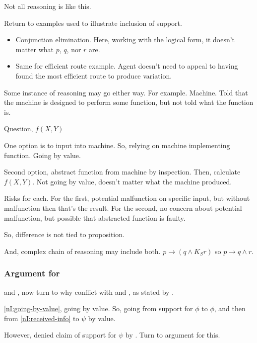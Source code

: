 \begin{note}
  Not all reasoning is like this.

  Return to examples used to illustrate inclusion of support.
  \begin{itemize}
  \item Conjunction elimination.
    Here, working with the logical form, it doesn't matter what \(p\), \(q\), nor \(r\) are.
  \item Same for efficient route example.
    Agent doesn't need to appeal to having found the most efficient route to produce variation.
  \end{itemize}

  Some instance of reasoning may go either way.
  For example.
  Machine.
  Told that the machine is designed to perform some function, but not told what the function is.

  Question, \(f(X,Y)\)

  One option is to input into machine.
  So, relying on machine implementing function.
  Going by value.

  Second option, abstract function from machine by inspection.
  Then, calculate \(f(X,Y)\).
  Not going by value, doesn't matter what the machine produced.

  Risks for each.
  For the first, potential malfunction on specific input, but without malfunction then that's the result.
  For the second, no concern about potential malfunction, but possible that abstracted function is faulty.

  So, difference is not tied to proposition.

  And, complex chain of reasoning may include both.
  \(p \rightarrow (q \land K_{S}r)\) so \(p \rightarrow q \land r\).
\end{note}

\subsubsection{Argument for \nI{}}
\label{sec:argument-ni}

\begin{note}[Review of \nI{}]
  \incl{} and \RBV{}, now turn to why conflict with \incl{} and \RBV{}, as stated by \nI{}.

  \ref{nI:going-by-value}, going by value.
  So, going from support for \(\phi\) to \(\phi\), and then from \ref{nI:received-info} to \(\psi\) by value.

  However, denied claim of support for \(\psi\) by \incl{}.
  Turn to argument for this.
\end{note}

